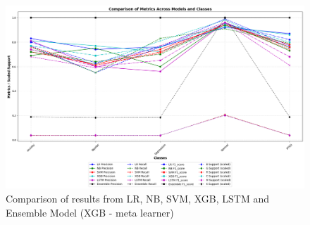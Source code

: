 \begin{figure}[h!]  
    \centering
    \includegraphics[width=1.0\textwidth]{Images/EM4 RESULT.png}  
    \caption{Comparison of results from LR, NB, SVM, XGB, LSTM and Ensemble Model (XGB - meta learner)}
    \label{dfdl1244883}  %
\end{figure}


